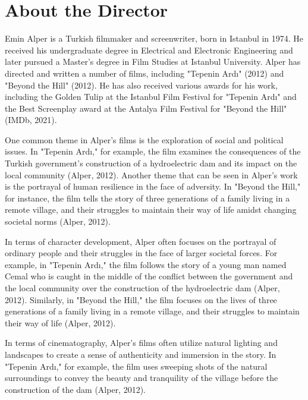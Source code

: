 \documentclass[12pt]{article}
\begin{document}
\maketitle

\section{About the Director}

Emin Alper is a Turkish filmmaker and screenwriter, born in Istanbul in 1974. He received his undergraduate degree in Electrical and Electronic Engineering and later pursued a Master's degree in Film Studies at Istanbul University. Alper has directed and written a number of films, including "Tepenin Ardı" (2012) and "Beyond the Hill" (2012). He has also received various awards for his work, including the Golden Tulip at the Istanbul Film Festival for "Tepenin Ardı" and the Best Screenplay award at the Antalya Film Festival for "Beyond the Hill" (IMDb, 2021).

One common theme in Alper's films is the exploration of social and political issues. In "Tepenin Ardı," for example, the film examines the consequences of the Turkish government's construction of a hydroelectric dam and its impact on the local community (Alper, 2012). Another theme that can be seen in Alper's work is the portrayal of human resilience in the face of adversity. In "Beyond the Hill," for instance, the film tells the story of three generations of a family living in a remote village, and their struggles to maintain their way of life amidst changing societal norms (Alper, 2012).

In terms of character development, Alper often focuses on the portrayal of ordinary people and their struggles in the face of larger societal forces. For example, in "Tepenin Ardı," the film follows the story of a young man named Cemal who is caught in the middle of the conflict between the government and the local community over the construction of the hydroelectric dam (Alper, 2012). Similarly, in "Beyond the Hill," the film focuses on the lives of three generations of a family living in a remote village, and their struggles to maintain their way of life (Alper, 2012).

In terms of cinematography, Alper's films often utilize natural lighting and landscapes to create a sense of authenticity and immersion in the story. In "Tepenin Ardı," for example, the film uses sweeping shots of the natural surroundings to convey the beauty and tranquility of the village before the construction of the dam (Alper, 2012).
\end{document}
